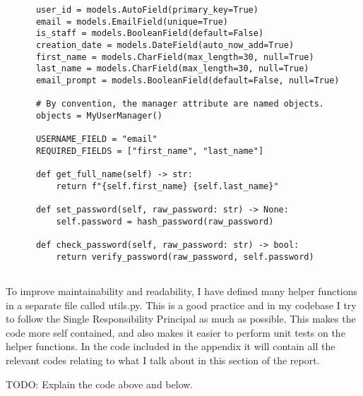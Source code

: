 \begin{verbatim}
      user_id = models.AutoField(primary_key=True)
      email = models.EmailField(unique=True)
      is_staff = models.BooleanField(default=False)
      creation_date = models.DateField(auto_now_add=True)
      first_name = models.CharField(max_length=30, null=True)
      last_name = models.CharField(max_length=30, null=True)
      email_prompt = models.BooleanField(default=False, null=True)
  
      # By convention, the manager attribute are named objects.
      objects = MyUserManager()
  
      USERNAME_FIELD = "email"
      REQUIRED_FIELDS = ["first_name", "last_name"]
  
      def get_full_name(self) -> str:
          return f"{self.first_name} {self.last_name}"
  
      def set_password(self, raw_password: str) -> None:
          self.password = hash_password(raw_password)
  
      def check_password(self, raw_password: str) -> bool:
          return verify_password(raw_password, self.password)
  
\end{verbatim}
To improve maintainability and readability, I have defined many helper functions in a separate file called utils.py. This is a good practice and in my codebase I try to follow the Single Responsibility Principal as much as possible. This makes the code more self contained, and also makes it easier to perform unit tests on the helper functions. In the code included in the appendix it will contain all the relevant codes relating to what I talk about in this section of the report.


TODO: Explain the code above and below.
